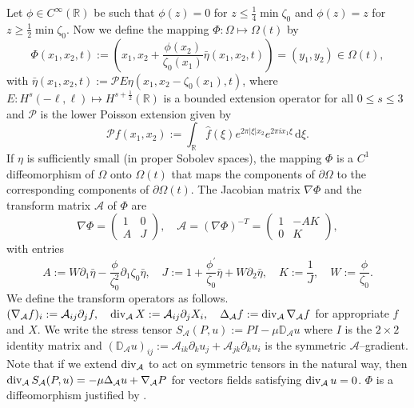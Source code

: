 \documentclass[letterpaper,reqno,10pt,twoside]{amsart}
\theoremstyle{definition}
\theoremstyle{remark}
\def\p{\partial}
\def\Om{\Omega}
\def\dive{\mathop{\rm div}\nolimits}
\begin{document}
	Let $\phi\in C^\infty(\mathbb{R})$ be such that $\phi(z)=0$ for $z\le\frac14\min\zeta_0$ and $\phi(z)=z$ for $z\ge\frac12\min\zeta_0$.
	Now we define the mapping $\Phi: \Om\mapsto\Om(t)$ by
	\begin{equation}\label{def:map}
		\Phi(x_1,x_2,t):=\left(x_1, x_2+\frac{\phi(x_2)}{\zeta_0(x_1)}\bar{\eta}(x_1,x_2,t)\right)=(y_1,y_2)\in\Om(t),
	\end{equation}
	with $
	\bar{\eta}(x_1,x_2,t):=\mathcal{P}E\eta(x_1,x_2-\zeta_0(x_1),t)$,
	where $E: H^s(-\ell,\ell)\mapsto H^{s+\frac{1}{2}}(\mathbb{R})$ is a bounded extension operator for all $0\le s\le 3$ and $\mathcal{P}$ is the lower Poisson extension given by
	\[
	\mathcal{P}f(x_1,x_2):=\int_{\mathbb{R}}\hat{f}(\xi)e^{2\pi|\xi| x_2}e^{2\pi ix_1\xi}\,\mathrm{d}\xi.
	\]
	If $\eta$ is sufficiently small (in proper Sobolev spaces), the mapping $\Phi$ is a $C^1$ diffeomorphism of $\Om$ onto $\Om(t)$ that maps the components of $\p\Om$ to the corresponding components of $\p\Om(t)$. The Jacobian matrix $\nabla\Phi$ and the transform matrix $\mathcal{A}$ of $\Phi$ are
	\begin{equation}\label{eq:Jaccobian}
		\nabla\Phi=\left(
		\begin{array}{cc}
			1&0\\
			A&J
		\end{array}
		\right), \quad
		\mathcal{A}=(\nabla\Phi)^{-T}=\left(
		\begin{array}{cc}
			1&-AK\\
			0&K
		\end{array}
		\right),
	\end{equation}
	with entries
	\begin{equation}\label{eq:components}
		A:=W\p_1\bar{\eta}-\frac{\phi}{\zeta_0^2}\p_1\zeta_0\bar{\eta},\quad J:=1+\frac{\phi^\prime}{\zeta_0}\bar{\eta}+W\p_2\bar{\eta},\quad K:=\frac{1}{J},\quad W:=\frac{\phi}{\zeta_0}.
	\end{equation}
	We define the transform operators as follows.
	$
	(\nabla_{\mathcal{A}}f)_i:=\mathcal{A}_{ij}\p_jf,\quad\dive_{\mathcal{A}}X:=\mathcal{A}_{ij}\p_j X_i,\quad \Delta_{\mathcal{A}}f:=\dive_{\mathcal{A}}\nabla_{\mathcal{A}}f
	$
	for appropriate $f$ and $X$. We write the stress tensor
	$
	S_{\mathcal{A}}(P,u):=PI-\mu\mathbb{D}_{\mathcal{A}}u
	$
	where $I$ is the $2\times2$ identity matrix and $(\mathbb{D}_{\mathcal{A}}u)_{ij}:=\mathcal{A}_{ik}\p_ku_j+\mathcal{A}_{jk}\p_ku_i$ is the symmetric $\mathcal{A}$--gradient. Note that if we extend $\dive_{\mathcal{A}}$ to act on symmetric tensors in the natural way, then $\dive_{\mathcal{A}}S_{\mathcal{A}}(P,u)=-\mu\Delta_{\mathcal{A}}u+\nabla_{\mathcal{A}}P$ for vectors fields satisfying $\dive_{\mathcal{A}}u=0$. $\Phi$ is a diffeomorphism justified by \cite{ZhT17}.
\end{document}

